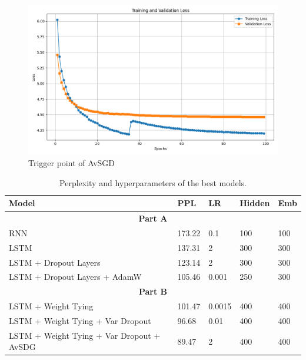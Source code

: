 \documentclass[a4paper]{article}
\begin{document}
\begin{figure}[h!]
\centering
\includegraphics[width=0.8\linewidth]{images/part_A_avsdg.png}
\caption{Trigger point of AvSGD}
\label{fig:plot-avsdg}
\end{figure}

\begin{table}[h!]
  \centering
  \begin{tabular}{l p{1 cm} p{1 cm} p{1 cm} p{1 cm}}
      \midrule
      \textbf{Model} & \textbf{PPL} & \textbf{LR} & \textbf{Hidden} & \textbf{Emb} \\
      \midrule
      \multicolumn{5}{c}{\textbf{Part A}} \\
      RNN                     & 173.22 & 0.1    & 100 & 100 \\
      LSTM                    & 137.31 & 2      & 300 & 300 \\
      LSTM + Dropout Layers      & 123.14 & 2      & 300 & 300 \\
      LSTM + Dropout Layers + AdamW & 105.46 & 0.001 & 250 & 300 \\
      \midrule
      \multicolumn{5}{c}{\textbf{Part B}} \\
      \midrule
      LSTM + Weight Tying & 101.47 & 0.0015 & 400 & 400 \\
      LSTM + Weight Tying + Var Dropout & 96.68 & 0.01 & 400 & 400 \\
      LSTM + Weight Tying + Var Dropout + AvSDG & 89.47 & 2 & 400 & 400 \\
      \bottomrule
  \end{tabular}
  \caption{Perplexity and hyperparameters of the best models.}
  \label{tab:results}
\end{table}




\end{document}
